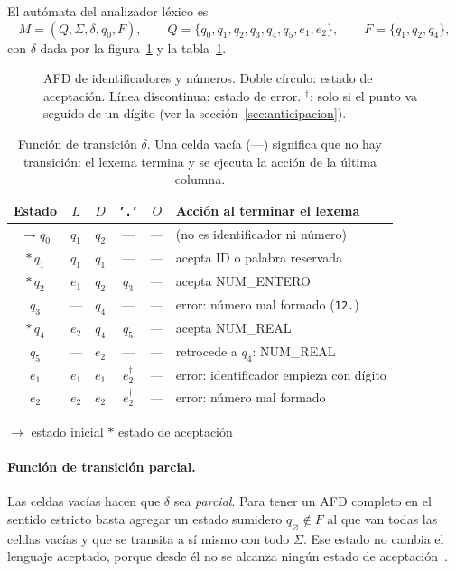 \documentclass[11pt, a4paper]{article}
\theoremstyle{plain}
\theoremstyle{definition}
\newcommand{\Sig}{\Sigma}
\newcommand{\pto}{\texttt{'.'}}               %
\newcommand{\lex}[1]{\texttt{#1}}             %
\begin{document}
El autómata del analizador léxico es
\[
  M = (Q, \Sig, \delta, q_0, F), \qquad
  Q = \{q_0, q_1, q_2, q_3, q_4, q_5, e_1, e_2\}, \qquad
  F = \{q_1, q_2, q_4\},
\]
con $\delta$ dada por la figura~\ref{fig:afd} y la tabla~\ref{tab:delta}.

\begin{figure}[ht]
  \centering
  \resizebox{\linewidth}{!}{}
  \caption{AFD de identificadores y números. Doble círculo: estado de aceptación.
    Línea discontinua: estado de error. $^{\dagger}$: solo si el punto va seguido de un
    dígito (ver la sección~\ref{sec:anticipacion}).}
  \label{fig:afd}
\end{figure}

\begin{table}[htbp]
  \centering
  \caption{Función de transición $\delta$. Una celda vacía (---) significa que no hay
    transición: el lexema termina y se ejecuta la acción de la última columna.}
  \label{tab:delta}
  \begin{tabular}{c c c c c l}
    \toprule
    Estado & $L$ & $D$ & \pto & $O$ & Acción al terminar el lexema \\
    \midrule
    $\to q_0$  & $q_1$ & $q_2$ & ---              & --- & (no es identificador ni número) \\
    $*\,q_1$   & $q_1$ & $q_1$ & ---              & --- & acepta \textsf{ID} o palabra reservada \\
    $*\,q_2$   & $e_1$ & $q_2$ & $q_3$            & --- & acepta \textsf{NUM\_ENTERO} \\
    $q_3$      & ---   & $q_4$ & ---              & --- & error: número mal formado (\lex{12.}) \\
    $*\,q_4$   & $e_2$ & $q_4$ & $q_5$            & --- & acepta \textsf{NUM\_REAL} \\
    $q_5$      & ---   & $e_2$ & ---              & --- & retrocede a $q_4$: \textsf{NUM\_REAL} \\
    $e_1$      & $e_1$ & $e_1$ & $e_2^{\dagger}$  & --- & error: identificador empieza con dígito \\
    $e_2$      & $e_2$ & $e_2$ & $e_2^{\dagger}$  & --- & error: número mal formado \\
    \bottomrule
  \end{tabular}

  \smallskip
  {\footnotesize $\to$ estado inicial \quad $*$ estado de aceptación}
\end{table}

\paragraph{Función de transición parcial.} Las celdas vacías hacen que $\delta$ sea
\emph{parcial}. Para tener un AFD completo en el sentido estricto basta agregar un
estado sumidero $q_\varnothing \notin F$ al que van todas las celdas vacías y que se
transita a sí mismo con todo $\Sig$. Ese estado no cambia el lenguaje aceptado, porque
desde él no se alcanza ningún estado de aceptación~\cite{hmu}.
\end{document}
